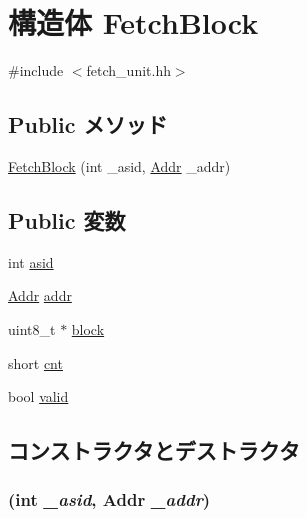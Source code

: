 \hypertarget{structFetchUnit_1_1FetchBlock}{
\section{構造体 FetchBlock}
\label{structFetchUnit_1_1FetchBlock}
}


{\ttfamily \#include $<$fetch\_\-unit.hh$>$}\subsection*{Public メソッド}
\begin{DoxyCompactItemize}
\item 
\hyperlink{structFetchUnit_1_1FetchBlock_ab56ad432caf9d8d5d1ff9b40ec905f7e}{FetchBlock} (int \_\-asid, \hyperlink{base_2types_8hh_af1bb03d6a4ee096394a6749f0a169232}{Addr} \_\-addr)
\end{DoxyCompactItemize}
\subsection*{Public 変数}
\begin{DoxyCompactItemize}
\item 
int \hyperlink{structFetchUnit_1_1FetchBlock_a3651868e9554e283ffdc0fb7631a934b}{asid}
\item 
\hyperlink{base_2types_8hh_af1bb03d6a4ee096394a6749f0a169232}{Addr} \hyperlink{structFetchUnit_1_1FetchBlock_a0bb77b4ba61e408313e1118250f9278c}{addr}
\item 
uint8\_\-t $\ast$ \hyperlink{structFetchUnit_1_1FetchBlock_a7011471cf10a6c24c9a0bce6e598970b}{block}
\item 
short \hyperlink{structFetchUnit_1_1FetchBlock_abc9543cb3f5442a6d291a5e8e5e2efa5}{cnt}
\item 
bool \hyperlink{structFetchUnit_1_1FetchBlock_a28e3c179a86f337095088b3ca02a2b2a}{valid}
\end{DoxyCompactItemize}


\subsection{コンストラクタとデストラクタ}
\hypertarget{structFetchUnit_1_1FetchBlock_ab56ad432caf9d8d5d1ff9b40ec905f7e}{
\subsubsection[{FetchBlock}]{ (int {\em \_\-asid}, \/  {\bf Addr} {\em \_\-addr})}}
\label{structFetchUnit_1_1FetchBlock_ab56ad432caf9d8d5d1ff9b40ec905f7e}



